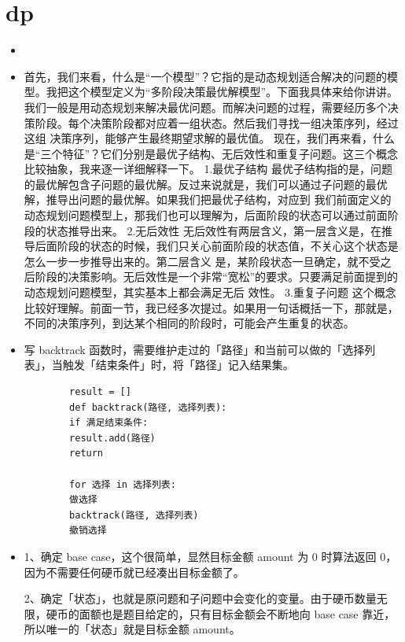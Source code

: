 \documentclass[a4paper,11pt,twoside]{book}
\begin{document}
\section{dp}
\begin{itemize}
	\item %
	
	\item \iffalse
		 首先，我们来看，什么是“一个模型”？它指的是动态规划适合解决的问题的模型。我把这个模型定义为“多阶段决策最优解模型”。下面我具体来给你讲讲。
	我们一般是用动态规划来解决最优问题。而解决问题的过程，需要经历多个决策阶段。每个决策阶段都对应着一组状态。然后我们寻找一组决策序列，经过这组
	决策序列，能够产生最终期望求解的最优值。
	现在，我们再来看，什么是“三个特征”？它们分别是最优子结构、无后效性和重复子问题。这三个概念比较抽象，我来逐一详细解释一下。
	1.最优子结构
	最优子结构指的是，问题的最优解包含子问题的最优解。反过来说就是，我们可以通过子问题的最优解，推导出问题的最优解。如果我们把最优子结构，对应到
	我们前面定义的动态规划问题模型上，那我们也可以理解为，后面阶段的状态可以通过前面阶段的状态推导出来。
	2.无后效性
	无后效性有两层含义，第一层含义是，在推导后面阶段的状态的时候，我们只关心前面阶段的状态值，不关心这个状态是怎么一步一步推导出来的。第二层含义
	是，某阶段状态一旦确定，就不受之后阶段的决策影响。无后效性是一个非常“宽松”的要求。只要满足前面提到的动态规划问题模型，其实基本上都会满足无后
	效性。
	3.重复子问题
	这个概念比较好理解。前面一节，我已经多次提过。如果用一句话概括一下，那就是，不同的决策序列，到达某个相同的阶段时，可能会产生重复的状态。
	
	\item 写 backtrack 函数时，需要维护走过的「路径」和当前可以做的「选择列表」，当触发「结束条件」时，将「路径」记入结果集。
	
	
	\begin{lstlisting}
		result = []
		def backtrack(路径, 选择列表):
		if 满足结束条件:
		result.add(路径)
		return
		
		for 选择 in 选择列表:
		做选择
		backtrack(路径, 选择列表)
		撤销选择
	\end{lstlisting}
	
	
	\item 1、确定 base case，这个很简单，显然目标金额 amount 为 0 时算法返回 0，因为不需要任何硬币就已经凑出目标金额了。
	
	2、确定「状态」，也就是原问题和子问题中会变化的变量。由于硬币数量无限，硬币的面额也是题目给定的，只有目标金额会不断地向 base case 靠近，所以唯一的「状态」就是目标金额 amount。
	

\end{itemize}
\end{document}

